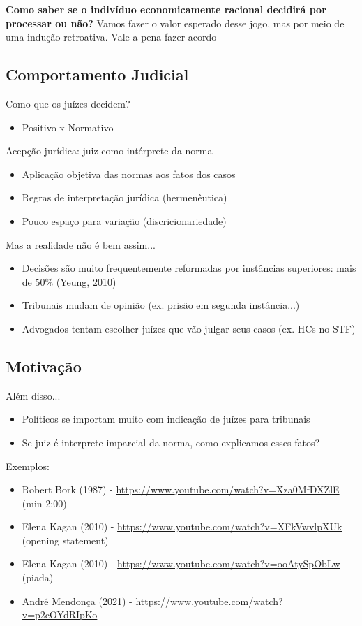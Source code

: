 \documentclass[a4paper,12pt]{article}[abntex2]
\begin{document}
\textbf{Como saber se o indivíduo economicamente  racional decidirá por processar ou não?}
Vamos fazer o valor esperado desse jogo, mas por meio de uma indução retroativa.
Vale a pena fazer acordo

\subsection{\textbf{Comportamento Judicial}}
Como que os juízes decidem?\begin{itemize}
    \item Positivo x Normativo
\end{itemize}

Acepção jurídica: juiz como intérprete da norma\begin{itemize}
    \item Aplicação objetiva das normas aos fatos dos casos
    \item Regras de interpretação jurídica (hermenêutica)
    \item Pouco espaço para variação (discricionariedade)
\end{itemize}

Mas a realidade não é bem assim...\begin{itemize}
    \item Decisões são muito frequentemente reformadas por instâncias superiores: mais de 50\% (Yeung, 2010)
    \item Tribunais mudam de opinião (ex. prisão em segunda instância...)
    \item Advogados tentam escolher juízes que vão julgar seus casos (ex. HCs no STF)
\end{itemize}

\subsection{\textbf{Motivação}}
Além disso...\begin{itemize}
    \item Políticos se importam muito com indicação de juízes para tribunais
    \item Se juiz é interprete imparcial da norma, como explicamos esses fatos?
\end{itemize}

Exemplos:\begin{itemize}
    \item Robert Bork (1987) - \url{https://www.youtube.com/watch?v=Xza0MfDXZlE} 
 (min 2:00)
    \item Elena Kagan (2010) - \url{https://www.youtube.com/watch?v=XFkVwvlpXUk } (opening statement)
    \item Elena Kagan (2010) - \url{https://www.youtube.com/watch?v=ooAtySpObLw } (piada)
    \item André Mendonça (2021)  - \url{https://www.youtube.com/watch?v=p2cOYdRIpKo}
\end{itemize}
\end{document}
